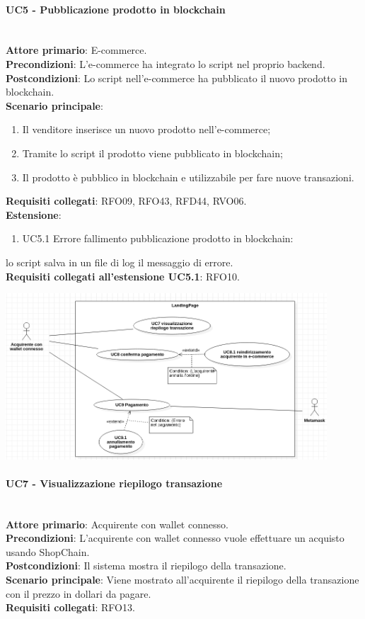 \documentclass[a4paper, 12pt]{article}
\begin{document}
\paragraph{UC5 - Pubblicazione prodotto in blockchain}\\
\textbf{Attore primario}: E-commerce.\\
\textbf{Precondizioni}: L'e-commerce ha integrato lo script nel proprio backend.\\
\textbf{Postcondizioni}: Lo script nell'e-commerce ha pubblicato il nuovo prodotto in blockchain.\\
\textbf{Scenario principale}:
\begin{enumerate}
    \item Il venditore inserisce un nuovo prodotto nell'e-commerce;
    \item Tramite lo script il prodotto viene pubblicato in blockchain;
    \item Il prodotto è pubblico in blockchain e utilizzabile per fare nuove transazioni.
\end{enumerate}
\textbf{Requisiti collegati}: RFO09, RFO43, RFD44, RVO06.\\
\textbf{Estensione}:
\begin{enumerate}
    \item UC5.1 Errore fallimento pubblicazione prodotto in blockchain:\\
\end{enumerate}
lo script salva in un file di log il messaggio di errore.\\
\textbf{Requisiti collegati all'estensione UC5.1}: RFO10.

\includegraphics[width=0.9\textwidth]{UC_LP2}

\paragraph{UC7 - Visualizzazione riepilogo transazione}\\
\textbf{Attore primario}: Acquirente con wallet connesso.\\
\textbf{Precondizioni}: L'acquirente con wallet connesso vuole effettuare un acquisto usando ShopChain.\\
\textbf{Postcondizioni}: Il sistema mostra il riepilogo della transazione.\\
\textbf{Scenario principale}:
Viene mostrato all'acquirente il riepilogo della transazione con il prezzo in dollari da pagare.\\
\textbf{Requisiti collegati}: RFO13.
\end{document}

